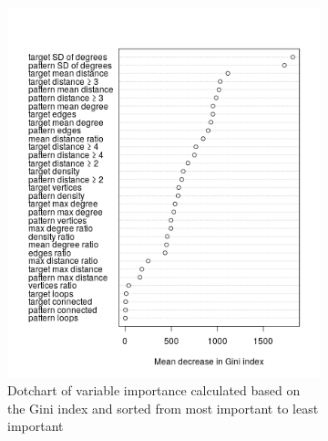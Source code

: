 \documentclass{l4proj}
\theoremstyle{definition}
\theoremstyle{remark}
\begin{document}
\begin{figure}
  \centering
  \begin{subfigure}[t]{0.49\textwidth}
    \centering
    \includegraphics[width=\textwidth]{images/unlabelled_variable_importance.png}
    \caption{Dotchart of variable importance calculated based on the Gini index
      and sorted from most important to least important}
    \label{fig:unlabelled_variable_importance}
  \end{subfigure}
  \begin{subfigure}[t]{0.49\textwidth}
    \centering

\end{subfigure}
\end{figure}
\end{document}
